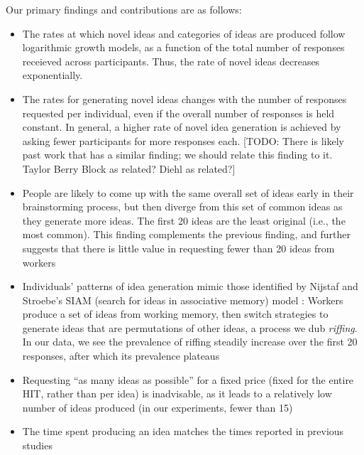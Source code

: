 Our primary findings and contributions are as follows:
\begin{itemize}
\item The rates at which novel ideas and categories of ideas are produced follow logarithmic growth models, as a function of the total number of responses receieved across participants. Thus, the rate of novel ideas decreases exponentially. 
\item The rates for generating novel ideas changes with the number of responses requested per individual, even if the overall number of responses is held constant. In general, a higher rate of novel idea generation is achieved by asking fewer participants for more responses each. [TODO: There is likely past work that has a similar finding; we should relate this finding to it. Taylor Berry Block as related? Diehl as related?]
\item People are likely to come up with the same overall set of ideas early in their brainstorming process, but then diverge from this set of common ideas as they generate more ideas. The first 20 ideas are the least original (i.e., the most common). This finding complements the previous finding, and further suggests that there is little value in requesting fewer than 20 ideas from workers
\item Individuals' patterns of idea generation mimic those identified by Nijstaf and Stroebe's SIAM (search for ideas in associative memory) model \cite{nijstad_how_2006}: Workers produce a set of ideas from working memory, then switch strategies to generate ideas that are permutations of other ideas, a process we dub {\em riffing\/}. In our data, we see the prevalence of riffing steadily increase over the first 20 responses, after which its prevalence plateaus
\item Requesting ``as many ideas as possible'' for a fixed price (fixed for the entire HIT, rather than per idea) is inadvisable, as it leads to a relatively low number of ideas produced (in our experiments, fewer than 15)
\item The time spent producing an idea matches the times reported in previous studies \cite{nijstad_how_2006}
\end{itemize}


